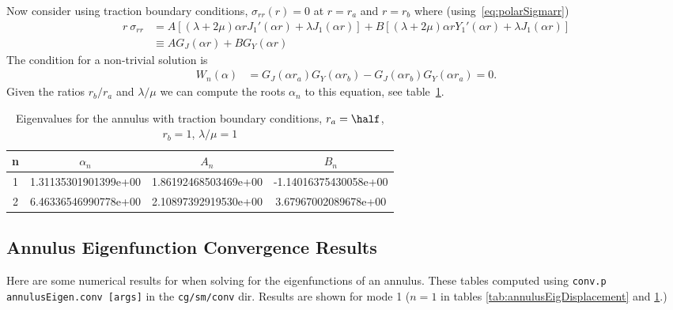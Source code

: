 Now consider using traction boundary conditions, $\sigma_{rr}(r)=0$ at $r=r_a$ and $r=r_b$ where 
(using~\eqref{eq:polarSigmarr})
\begin{align*}
 r~\sigma_{rr} &= A\left[ (\lambda+2\mu) \alpha r J_1'(\alpha r) +\lambda J_1(\alpha r)\right]
               + B\left[ (\lambda+2\mu) \alpha r Y_1'(\alpha r) +\lambda J_1(\alpha r)\right]  \\
              &\equiv A G_J(\alpha r) + B G_Y(\alpha r)
\end{align*}
The condition for a non-trivial solution is 
\begin{align*}
   W_n(\alpha) &= G_J(\alpha r_a) G_Y(\alpha r_b) - G_J(\alpha r_b) G_Y(\alpha  r_a) =0. 
\end{align*}
Given the ratios $r_b/r_a$ and $\lambda/\mu$ we can compute the roots $\alpha_n$ to this
equation, see table~\ref{tab:annulusEigTraction}. 
\begin{table}[hbt]
\begin{center}
\begin{tabular}{|c|c|c|c|} \hline
n & $\alpha_n$  & $A_n$ & $B_n$ \\ \hline 
1 & 1.31135301901399e+00 &1.86192468503469e+00 &-1.14016375430058e+00\\
2 & 6.46336546990778e+00 &2.10897392919530e+00 &3.67967002089678e+00 \\ 
\hline
\end{tabular}
\caption{Eigenvalues for the annulus with traction boundary conditions, $r_a=\half$, $r_b=1$, $\lambda/\mu=1$}\label{tab:annulusEigTraction}
\end{center}
\end{table}


\subsection{Annulus Eigenfunction Convergence Results}

Here are some numerical results for when solving for the eigenfunctions of an annulus. 
These tables computed using
{\tt conv.p annulusEigen.conv [args]} in the {\tt cg/sm/conv} dir. Results are shown for mode 1 ($n=1$ in tables
\ref{tab:annulusEigDisplacement} and \ref{tab:annulusEigTraction}.)


